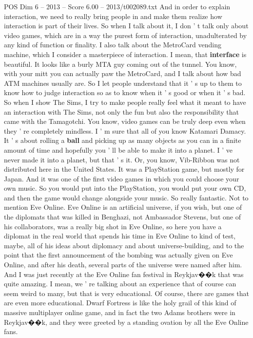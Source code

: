 \begin{textsample}{POS Dim 6 – 2013 – Score 6.00 – 2013/t002089.txt}
And in order to explain interaction, we need to really bring people in and make them realize how interaction is part of their lives.
So when I talk about it, I don ' t talk only about video games, which are in a way the purest form of interaction, unadulterated by any kind of function or finality.
I also talk about the MetroCard vending machine, which I consider a masterpiece of interaction.
I mean, that \textbf{interface} is beautiful.
It looks like a burly MTA guy coming out of the tunnel.
You know, with your mitt you can actually paw the MetroCard, and I talk about how bad ATM machines usually are.
So I let people understand that it ' s up to them to know how to judge interaction so as to know when it ' s good or when it ' s bad.
So when I show The Sims, I try to make people really feel what it meant to have an interaction with The Sims, not only the fun but also the responsibility that came with the Tamagotchi.
You know, video games can be truly deep even when they ' re completely mindless.
I ' m sure that all of you know Katamari Damacy.
It ' s about rolling a \textbf{ball} and picking up as many objects as you can in a finite amount of time and hopefully you ' ll be able to make it into a planet.
I ' ve never made it into a planet, but that ' s it.
Or, you know, Vib-Ribbon was not distributed here in the United States.
It was a PlayStation game, but mostly for Japan.
And it was one of the first video games in which you could choose your own music.
So you would put into the PlayStation, you would put your own CD, and then the game would change alongside your music.
So really fantastic.
Not to mention Eve Online.
Eve Online is an artificial universe, if you wish, but one of the diplomats that was killed in Benghazi, not Ambassador Stevens, but one of his collaborators, was a really big shot in Eve Online, so here you have a diplomat in the real world that spends his time in Eve Online to kind of test, maybe, all of his ideas about diplomacy and about universe-building, and to the point that the first announcement of the bombing was actually given on Eve Online, and after his death, several parts of the universe were named after him.
And I was just recently at the Eve Online fan festival in Reykjav{\EmojiFont �}{\EmojiFont �}k that was quite amazing.
I mean, we ' re talking about an experience that of course can seem weird to many, but that is very educational.
Of course, there are games that are even more educational.
Dwarf Fortress is like the holy grail of this kind of massive multiplayer online game, and in fact the two Adams brothers were in Reykjav{\EmojiFont �}{\EmojiFont �}k, and they were greeted by a standing ovation by all the Eve Online fans.

\end{textsample}
